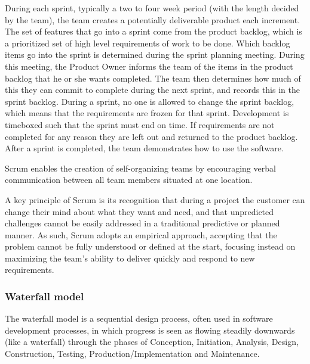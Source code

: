 During each sprint, typically a two to four week period (with the length decided by the team), 
the team creates a potentially deliverable product each increment. 
The set of features that go into a sprint come from the product backlog, 
which is a prioritized set of high level requirements of work to be done. 
Which backlog items go into the sprint is determined during the sprint planning meeting. 
During this meeting, the Product Owner informs the team of the items in the product backlog that he 
or she wants completed. 
The team then determines how much of this they can commit to complete during the next sprint, 
and records this in the sprint backlog. 
During a sprint, no one is allowed to change the sprint backlog, which means that the requirements
are frozen for that sprint. Development is timeboxed such that the sprint must end on time. 
If requirements are not completed for any reason they are left out and returned to the product backlog. 
After a sprint is completed, the team demonstrates how to use the software.

Scrum enables the creation of self-organizing teams by encouraging verbal communication between all team members situated at one location.

A key principle of Scrum is its recognition that during a project the customer can change their
mind about what they want and need, and that unpredicted challenges cannot be easily addressed 
in a traditional predictive or planned manner. 
As such, Scrum adopts an empirical approach, accepting that the problem cannot be fully understood 
or defined at the start, focusing instead on maximizing the team’s ability to deliver quickly and
respond to new requirements.

\subsubsection{Waterfall model}
The waterfall model is a sequential design process, often used in software development processes, 
in which progress is seen as flowing steadily downwards (like a waterfall) through the phases of
Conception, Initiation, Analysis, Design, Construction, Testing, Production/Implementation and Maintenance.

